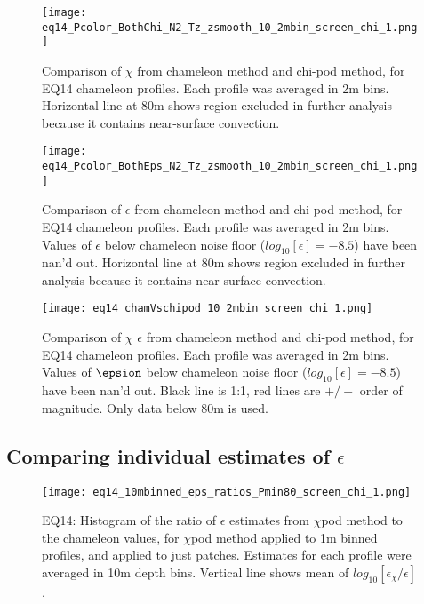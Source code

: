 \documentclass[11pt]{article}
\begin{document}
\begin{figure}[htbp]
\texttt{[image: eq14\_Pcolor\_BothChi\_N2\_Tz\_zsmooth\_10\_2mbin\_screen\_chi\_1.png]}
\caption{Comparison of $\chi$ from chameleon method and chi-pod method, for EQ14 chameleon profiles. Each profile was averaged in 2m bins.  Horizontal line at 80m shows region excluded in further analysis because it contains near-surface convection.}
\label{chi_overview}
\end{figure}

\begin{figure}[htbp]
\texttt{[image: eq14\_Pcolor\_BothEps\_N2\_Tz\_zsmooth\_10\_2mbin\_screen\_chi\_1.png]}
\caption{Comparison of $\epsilon$ from chameleon method and chi-pod method, for EQ14 chameleon profiles. Each profile was averaged in 2m bins.  Values of $\epsilon$ below chameleon noise floor ($log_{10}[\epsilon]=-8.5$) have been nan'd out. Horizontal line at 80m shows region excluded in further analysis because it contains near-surface convection.}
\label{eps_overview}
\end{figure}



\begin{figure}[htbp]
\texttt{[image: eq14\_chamVschipod\_10\_2mbin\_screen\_chi\_1.png]}
\caption{Comparison of $\chi$ $\epsilon$ from chameleon method and chi-pod method, for EQ14 chameleon profiles. Each profile was averaged in 2m bins.  Values of $\epsion$ below chameleon noise floor ($log_{10}[\epsilon]=-8.5$) have been nan'd out. Black line is 1:1, red lines are $+/-$ order of magnitude. Only data below 80m is used.}
\label{chamVschi}
\end{figure}




\clearpage
\subsection{Comparing individual estimates of $\epsilon$}

\begin{figure}[htbp]
\texttt{[image: eq14\_10mbinned\_eps\_ratios\_Pmin80\_screen\_chi\_1.png]}
\caption{EQ14: Histogram of the ratio of $\epsilon$ estimates from $\chi$pod method to the chameleon values, for $\chi$pod method applied to 1m binned profiles, and applied to just patches. Estimates for each profile were averaged in 10m depth bins. Vertical line shows mean of $log_{10}[\epsilon_{\chi}/\epsilon]$.}
\label{epsrathist_eq14}
\end{figure}
\end{document}
